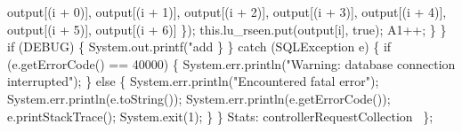           output[(i + 0)],
          output[(i + 1)],
          output[(i + 2)],
          output[(i + 3)],
          output[(i + 4)],
          output[(i + 5)],
          output[(i + 6)] \});
        this.lu_rseen.put(output[i], true);
        A1++;
      \}
    \}
    if (DEBUG) \{
      System.out.printf("add %
    \}
  \} catch (SQLException e) \{
    if (e.getErrorCode() == 40000) \{
      System.err.println("Warning: database connection interrupted");
    \} else \{
      System.err.println("Encountered fatal error");
      System.err.println(e.toString());
      System.err.println(e.getErrorCode());
      e.printStackTrace();
      System.exit(1);
    \}
  \}
  \LA{}Stats: controllerRequestCollection~{\nwtagstyle{}}\RA{}
\};
\nwendcode{}\nwdocspar

